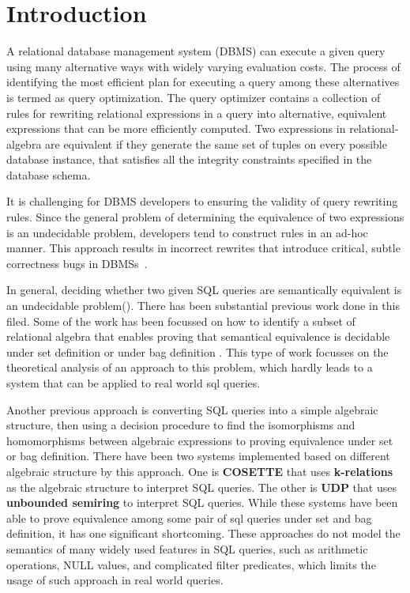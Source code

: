 \section{Introduction}\label{sec:introduction}

A relational database management system (DBMS) can execute a given query using
many alternative ways with widely varying evaluation costs. 
The process of identifying the most efficient plan for executing a query among
these alternatives is termed as query optimization. 
The query optimizer contains a collection of rules for rewriting relational
expressions in a query into alternative, equivalent expressions that can be more
efficiently computed. Two expressions in relational-algebra are equivalent 
if they generate the same set of tuples on every possible database instance,
that satisfies all the integrity constraints specified in the database schema.
 
It is challenging for DBMS developers to ensuring the validity of query
rewriting rules. Since the general problem of determining the equivalence of two
expressions is an undecidable problem, developers tend to construct rules
in an ad-hoc manner. This approach results in incorrect rewrites that introduce
critical, subtle correctness bugs in DBMSs~\cite{ganski87}.

In general, deciding whether two given SQL queries are semantically equivalent
is an undecidable problem().
There has been substantial previous work done in this filed.
Some of the work has been focussed on how to identify a subset of relational
algebra that enables proving that semantical equivalence is decidable under set
definition  or under bag definition .
This type of work focusses on the theoretical analysis of an approach to this
problem, which hardly leads to a system that can be applied to real world sql
queries.

Another previous approach is converting SQL queries into a simple algebraic
structure, then using a decision procedure to find the isomorphisms and
homomorphisms between algebraic expressions to proving equivalence under set or
bag definition.
There have been two systems implemented based on different algebraic structure
by this approach.
One is \textbf{COSETTE}  that uses \textbf{k-relations} as the
algebraic structure to interpret SQL queries.
The other is \textbf{UDP}  that uses \textbf{unbounded semiring} to
interpret SQL queries.
While these systems have been able to prove equivalence among some pair of sql
queries under set and bag definition, it has one significant shortcoming.
These approaches do not model the semantics of many widely used features in SQL
queries, such as arithmetic operations, NULL values, and complicated filter predicates,
which limits the usage of such approach in real world queries.

